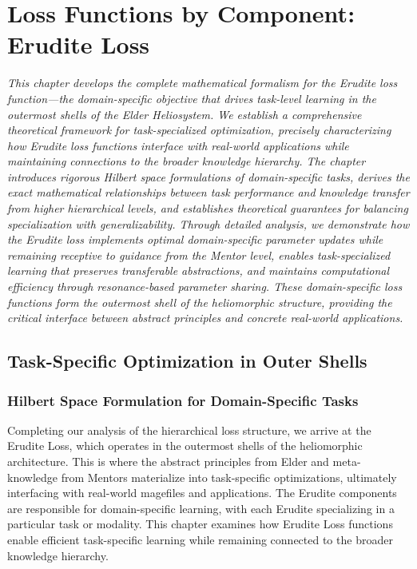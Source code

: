 \chapter{Loss Functions by Component: Erudite Loss}

\textit{This chapter develops the complete mathematical formalism for the Erudite loss function—the domain-specific objective that drives task-level learning in the outermost shells of the Elder Heliosystem. We establish a comprehensive theoretical framework for task-specialized optimization, precisely characterizing how Erudite loss functions interface with real-world applications while maintaining connections to the broader knowledge hierarchy. The chapter introduces rigorous Hilbert space formulations of domain-specific tasks, derives the exact mathematical relationships between task performance and knowledge transfer from higher hierarchical levels, and establishes theoretical guarantees for balancing specialization with generalizability. Through detailed analysis, we demonstrate how the Erudite loss implements optimal domain-specific parameter updates while remaining receptive to guidance from the Mentor level, enables task-specialized learning that preserves transferable abstractions, and maintains computational efficiency through resonance-based parameter sharing. These domain-specific loss functions form the outermost shell of the heliomorphic structure, providing the critical interface between abstract principles and concrete real-world applications.}

\section{Task-Specific Optimization in Outer Shells}

\subsection{Hilbert Space Formulation for Domain-Specific Tasks}

Completing our analysis of the hierarchical loss structure, we arrive at the Erudite Loss, which operates in the outermost shells of the heliomorphic architecture. This is where the abstract principles from Elder and meta-knowledge from Mentors materialize into task-specific optimizations, ultimately interfacing with real-world magefiles and applications. The Erudite components are responsible for domain-specific learning, with each Erudite specializing in a particular task or modality. This chapter examines how Erudite Loss functions enable efficient task-specific learning while remaining connected to the broader knowledge hierarchy.

